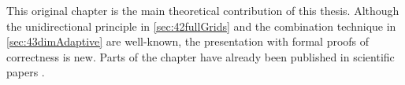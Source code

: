 This original chapter is the main theoretical contribution of this thesis.
Although the unidirectional principle in \cref{sec:42fullGrids} and
the combination technique in \cref{sec:43dimAdaptive} are well-known,
the presentation with formal proofs of correctness is new.
Parts of the chapter have already been published in scientific papers
\cite{Valentin18Fundamental}.









\cleardoublepage
